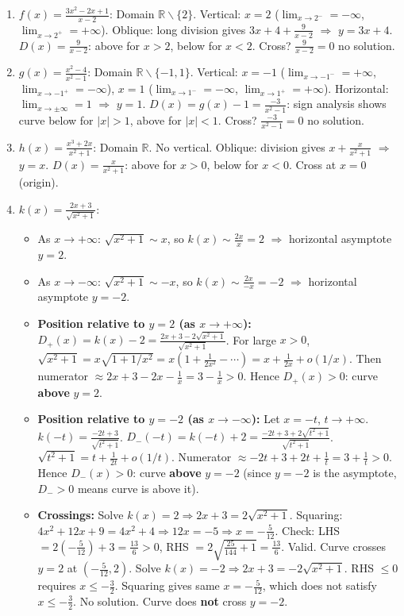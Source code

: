 \documentclass[11pt]{article}
\def\setminus{\mathbin{\backslash}}\let\smallsetminus\setminus
\begin{document}
\begin{corrige}[Exercises 1–4]
\begin{enumerate}
\item $f(x) = \frac{3x^2-2x+1}{x-2}$: Domain $\mathbb{R}\setminus\{2\}$. Vertical: $x=2$ ($\lim_{x\to2^-}=-\infty$, $\lim_{x\to2^+}=+\infty$). Oblique: long division gives $3x+4+\frac{9}{x-2}$ $\Rightarrow$ $y=3x+4$. $D(x)=\frac{9}{x-2}$: above for $x>2$, below for $x<2$. Cross? $\frac{9}{x-2}=0$ no solution.
\item $g(x) = \frac{x^2-4}{x^2-1}$: Domain $\mathbb{R}\setminus\{-1,1\}$. Vertical: $x=-1$ ($\lim_{x\to-1^-}=+\infty$, $\lim_{x\to-1^+}=-\infty$), $x=1$ ($\lim_{x\to1^-}=-\infty$, $\lim_{x\to1^+}=+\infty$). Horizontal: $\lim_{x\to\pm\infty}=1$ $\Rightarrow$ $y=1$. $D(x)=g(x)-1=\frac{-3}{x^2-1}$: sign analysis shows curve below for $|x|>1$, above for $|x|<1$. Cross? $\frac{-3}{x^2-1}=0$ no solution.
\item $h(x) = \frac{x^3+2x}{x^2+1}$: Domain $\mathbb{R}$. No vertical. Oblique: division gives $x + \frac{x}{x^2+1}$ $\Rightarrow$ $y=x$. $D(x)=\frac{x}{x^2+1}$: above for $x>0$, below for $x<0$. Cross at $x=0$ (origin).
\item $k(x) = \frac{2x+3}{\sqrt{x^2+1}}$: 
  \begin{itemize}
  \item As $x\to+\infty$: $\sqrt{x^2+1}\sim x$, so $k(x)\sim \frac{2x}{x}=2$ $\Rightarrow$ horizontal asymptote $y=2$.
  \item As $x\to-\infty$: $\sqrt{x^2+1}\sim -x$, so $k(x)\sim \frac{2x}{-x}=-2$ $\Rightarrow$ horizontal asymptote $y=-2$.
  \item \textbf{Position relative to $y=2$ (as $x\to+\infty$):} $D_+(x)=k(x)-2 = \frac{2x+3-2\sqrt{x^2+1}}{\sqrt{x^2+1}}$. For large $x>0$, $\sqrt{x^2+1}=x\sqrt{1+1/x^2}=x(1+\frac{1}{2x^2}-\cdots)=x+\frac{1}{2x}+o(1/x)$. Then numerator $\approx 2x+3-2x-\frac{1}{x}=3-\frac{1}{x}>0$. Hence $D_+(x)>0$: curve \textbf{above} $y=2$.
  \item \textbf{Position relative to $y=-2$ (as $x\to-\infty$):} Let $x=-t$, $t\to+\infty$. $k(-t)=\frac{-2t+3}{\sqrt{t^2+1}}$. $D_-(-t)=k(-t)+2 = \frac{-2t+3+2\sqrt{t^2+1}}{\sqrt{t^2+1}}$. $\sqrt{t^2+1}=t+\frac{1}{2t}+o(1/t)$. Numerator $\approx -2t+3+2t+\frac{1}{t}=3+\frac{1}{t}>0$. Hence $D_-(x)>0$: curve \textbf{above} $y=-2$ (since $y=-2$ is the asymptote, $D_->0$ means curve is above it).
  \item \textbf{Crossings:} Solve $k(x)=2 \Rightarrow 2x+3=2\sqrt{x^2+1}$. Squaring: $4x^2+12x+9=4x^2+4 \Rightarrow 12x=-5 \Rightarrow x=-\frac{5}{12}$. Check: LHS $=2(-\frac{5}{12})+3=\frac{13}{6}>0$, RHS $=2\sqrt{\frac{25}{144}+1}=\frac{13}{6}$. Valid. Curve crosses $y=2$ at $\left(-\frac{5}{12},2\right)$.
  Solve $k(x)=-2 \Rightarrow 2x+3=-2\sqrt{x^2+1}$. RHS $\le 0$ requires $x\le -\frac{3}{2}$. Squaring gives same $x=-\frac{5}{12}$, which does not satisfy $x\le -\frac{3}{2}$. No solution. Curve does \textbf{not} cross $y=-2$.
  \end{itemize}
\end{enumerate}
\end{corrige}
\end{document}

